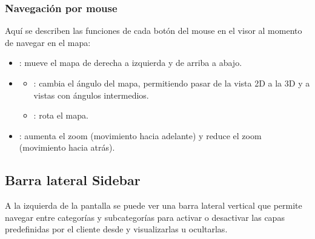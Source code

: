 \documentclass[a4paper,11pt,spanish]{sphinxmanual}
\begin{document}
\subsubsection{Navegación por mouse}
\label{\detokenize{navigation/interfaz:navegacion-por-mouse}}
\sphinxAtStartPar
Aquí se describen las funciones de cada botón del mouse en el visor al momento de navegar en el mapa:
\begin{itemize}
\item {} 
\sphinxAtStartPar
{}: mueve el mapa de derecha a izquierda y de arriba a abajo.

\item {} \begin{description}
\begin{itemize}
\item {} 
\sphinxAtStartPar
{}: cambia el ángulo del mapa, permitiendo pasar de la vista 2D a la 3D y a vistas con ángulos intermedios.

\item {} 
\sphinxAtStartPar
{}: rota el mapa.

\end{itemize}

\end{description}

\item {} 
\sphinxAtStartPar
{}: aumenta el zoom (movimiento hacia adelante) y reduce el zoom (movimiento hacia atrás).

\end{itemize}

\sphinxstepscope


\subsection{Barra lateral \sphinxhyphen{} Sidebar}
\label{\detokenize{navigation/sidebar:barra-lateral-sidebar}}\label{\detokenize{navigation/sidebar::doc}}

\sphinxAtStartPar
A la izquierda de la pantalla se puede ver una barra lateral vertical que permite navegar entre categorías y subcategorías para activar o desactivar las capas predefinidas por el cliente desde  y visualizarlas u ocultarlas.
\end{document}
